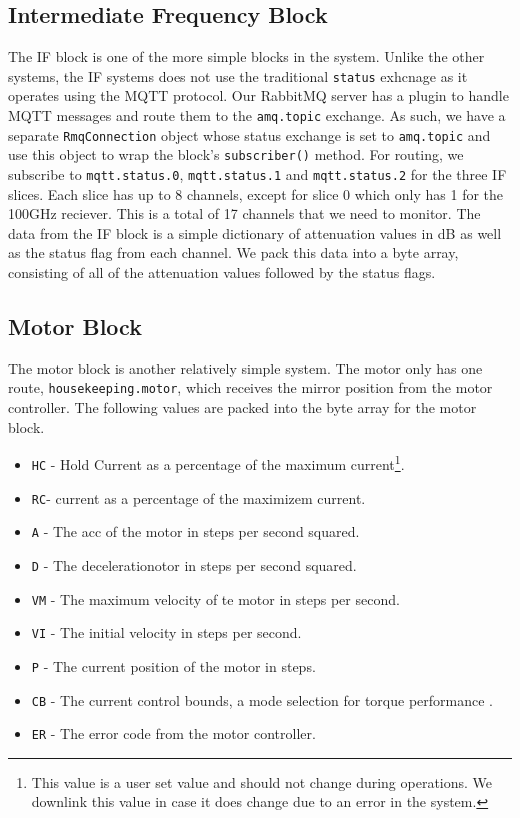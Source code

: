 \subsection{Intermediate Frequency Block}
The IF block is one of the more simple blocks in the system.
Unlike the other systems, the IF systems does not use the traditional \texttt{status} exhcnage as it operates using the MQTT protocol. 
Our RabbitMQ server has a plugin to handle MQTT messages and route them to the \texttt{amq.topic} exchange. 
As such, we have a separate \texttt{RmqConnection} object whose status exchange is set to \texttt{amq.topic} and use this object to wrap the block's \texttt{subscriber()} method.
For routing, we subscribe to \texttt{mqtt.status.0}, \texttt{mqtt.status.1} and \texttt{mqtt.status.2} for the three IF slices.
Each slice has up to 8 channels, except for slice 0 which only has 1 for the 100GHz reciever. 
This is a total of 17 channels that we need to monitor.
The data from the IF block is a simple dictionary of attenuation values in dB as well as the status flag from each channel.
We pack this data into a byte array, consisting of all of the attenuation values followed by the status flags.

\subsection{Motor Block}
The motor block is another relatively simple system.
The motor only has one route, \texttt{housekeeping.motor}, which receives the mirror position from the motor controller.
The following values are packed into the byte array for the motor block.
\begin{itemize}
    \item \texttt{HC} - Hold Current as a percentage of the maximum current\footnote{\label{chap2/footnote:motor}This value is a user set value and should not change during operations. We downlink this value in case it does change due to an error in the system.}.
    \item \texttt{RC}- current as a percentage of the maximizem current\footnotemark[\ref{chap2/footnote:motor}].
    \item \texttt{A} - The acc of the motor in steps per second squared\footnotemark[\ref{chap2/footnote:motor}].
    \item \texttt{D} - The decelerationotor in steps per second squared\footnotemark[\ref{chap2/footnote:motor}].
    \item \texttt{VM} - The maximum velocity of te motor in steps per second\footnotemark[\ref{chap2/footnote:motor}].
    \item \texttt{VI} - The initial velocity in steps per second\footnotemark[\ref{chap2/footnote:motor}].
    \item \texttt{P} - The current position of the motor in steps.
    \item \texttt{CB} - The current control bounds, a mode selection for torque performance \footnotemark[\ref{chap2/footnote:motor}].
    \item \texttt{ER} - The error code from the motor controller.
\end{itemize}

